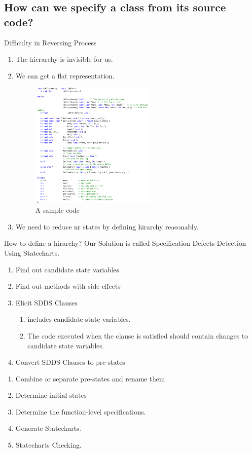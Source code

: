 ﻿\documentclass{beamer}
\begin{document}
\subsection{How can we specify a class from its source code?}
\begin{frame}{Difficulty in Reversing Process}
  \begin{enumerate}
  \item The hierarchy is invisible for us. \pause
  \item We can get a flat representation. \pause
    \begin{figure}
      \includegraphics[width=2.4in]{img/2.PNG}
      \caption{A sample code}
    \end{figure}
  \item We need to reduce nr states by defining hirarchy reasonably.
  \end{enumerate}
\end{frame}

\begin{frame}{How to define a hirarchy?}
  Our Solution is called Specification Defects Detection Using Statecharts. \pause
  \begin{enumerate}
  \item Find out candidate state variables  \pause
  \item Find out methods with side effects \pause
  \item Elicit SDDS Clauses \pause
    \begin{enumerate}
    \item includes candidate state variables.
    \item The code executed when the clause is satisfied should contain changes to candidate state variables.
    \end{enumerate}
  \item	Convert SDDS Clauses to pre-states \pause
  \end{enumerate}
\end{frame}
\begin{frame}
  \begin{enumerate}
  \item Combine or separate pre-states and rename them \pause
  \item Determine initial states \pause
  \item Determine the function-level specifications. \pause
  \item Generate Statecharts. \pause
  \item Statecharts Checking. 
  \end{enumerate}
\end{frame}
\end{document}
